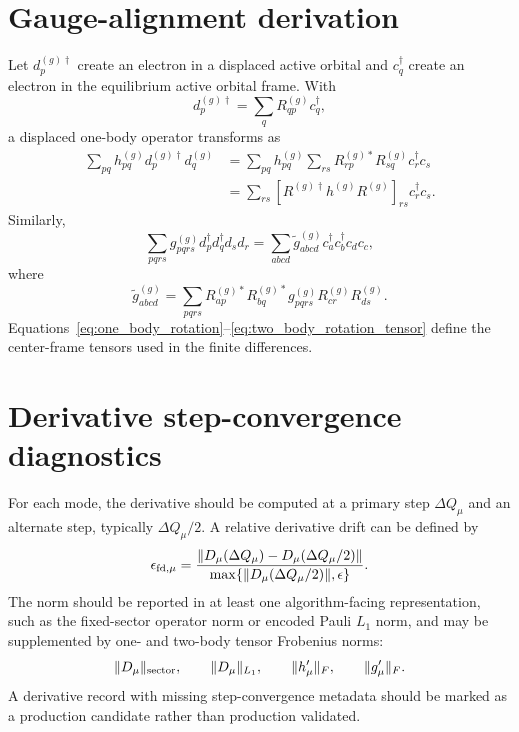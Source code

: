\documentclass[
  reprint,
  amsmath,
  amssymb,
  aps,
  pra,
  nofootinbib,
  superscriptaddress,
  floatfix
]{revtex4-2}
\begin{document}
\section{Gauge-alignment derivation}
\label{app:gauge_alignment}

Let \(d_p^{(g)\dagger}\) create an electron in a displaced active orbital and \(c_q^\dagger\) create an electron in the equilibrium active orbital frame.  With
\begin{equation}
d_p^{(g)\dagger}
=
\sum_q R_{qp}^{(g)}c_q^\dagger,
\label{eq:orbital_rotation_creation}
\end{equation}
a displaced one-body operator transforms as
\begin{align}
\sum_{pq}h_{pq}^{(g)}d_p^{(g)\dagger}d_q^{(g)}
&=
\sum_{pq}h_{pq}^{(g)}
\sum_{rs}
R_{rp}^{(g)*}R_{sq}^{(g)}
c_r^\dagger c_s
\nonumber\\
&=
\sum_{rs}
\left[
R^{(g)\dagger}h^{(g)}R^{(g)}
\right]_{rs}
c_r^\dagger c_s .
\label{eq:one_body_rotation}
\end{align}
Similarly,
\begin{equation}
\sum_{pqrs}g_{pqrs}^{(g)}
d_p^\dagger d_q^\dagger d_s d_r
=
\sum_{abcd}
\widetilde g_{abcd}^{(g)}
c_a^\dagger c_b^\dagger c_d c_c,
\label{eq:two_body_rotation}
\end{equation}
where
\begin{equation}
\widetilde g_{abcd}^{(g)}
=
\sum_{pqrs}
R_{ap}^{(g)*}
R_{bq}^{(g)*}
g_{pqrs}^{(g)}
R_{cr}^{(g)}
R_{ds}^{(g)}.
\label{eq:two_body_rotation_tensor}
\end{equation}
Equations~\eqref{eq:one_body_rotation}--\eqref{eq:two_body_rotation_tensor} define the center-frame tensors used in the finite differences.

\section{Derivative step-convergence diagnostics}
\label{app:fd_diagnostics}

For each mode, the derivative should be computed at a primary step \(\Delta Q_\mu\) and an alternate step, typically \(\Delta Q_\mu/2\).  A relative derivative drift can be defined by
\begin{equation}
\epsilon_{{\rm fd},\mu}
=
\frac{
\|D_\mu(\Delta Q_\mu)-D_\mu(\Delta Q_\mu/2)\|
}{
\max\{\|D_\mu(\Delta Q_\mu/2)\|,\epsilon\}
}.
\label{eq:fd_drift}
\end{equation}
The norm should be reported in at least one algorithm-facing representation, such as the fixed-sector operator norm or encoded Pauli \(L_1\) norm, and may be supplemented by one- and two-body tensor Frobenius norms:
\begin{equation}
\|D_\mu\|_{\rm sector},
\qquad
\|D_\mu\|_{L_1},
\qquad
\|h_\mu'\|_F,
\qquad
\|g_\mu'\|_F.
\label{eq:derivative_norms}
\end{equation}
A derivative record with missing step-convergence metadata should be marked as a production candidate rather than production validated.
\end{document}
